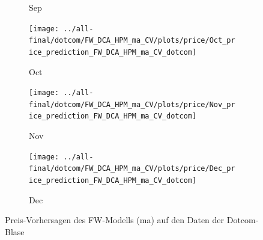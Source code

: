 \documentclass[ngerman]{ttlab-qualify}
\begin{document}
\begin{figure}[H]
\begin{subfigure}{.3\linewidth}
  \caption{Sep}
  \end{subfigure}\par\medskip
  \begin{subfigure}{.3\linewidth}
  \texttt{[image: ../all-final/dotcom/FW\_DCA\_HPM\_ma\_CV/plots/price/Oct\_price\_prediction\_FW\_DCA\_HPM\_ma\_CV\_dotcom]}\hfill
  \caption{Oct}
  \end{subfigure}
  \begin{subfigure}{.3\linewidth}
  \texttt{[image: ../all-final/dotcom/FW\_DCA\_HPM\_ma\_CV/plots/price/Nov\_price\_prediction\_FW\_DCA\_HPM\_ma\_CV\_dotcom]}\hfill
  \caption{Nov}
  \end{subfigure}
  \begin{subfigure}{.3\linewidth}
  \texttt{[image: ../all-final/dotcom/FW\_DCA\_HPM\_ma\_CV/plots/price/Dec\_price\_prediction\_FW\_DCA\_HPM\_ma\_CV\_dotcom]}\hfill
  \caption{Dec}
  \end{subfigure}
  \caption{Preis-Vorhersagen des FW-Modells (ma) auf den Daten der Dotcom-Blase}
\end{figure}
\end{document}
